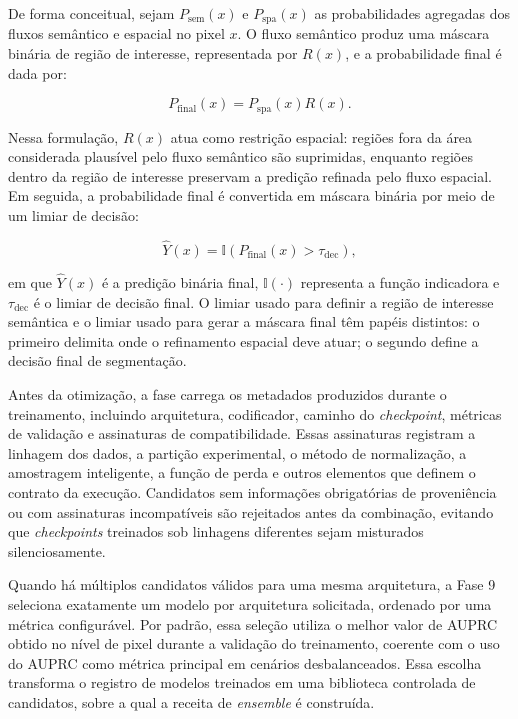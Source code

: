 De forma conceitual, sejam $P_{\mathrm{sem}}(x)$ e $P_{\mathrm{spa}}(x)$ as
probabilidades agregadas dos fluxos semântico e espacial no pixel $x$. O fluxo
semântico produz uma máscara binária de região de interesse, representada por
$R(x)$, e a probabilidade final é dada por:

\begin{equation}\label{eq:two-stream-gated-ensemble}
    P_{\mathrm{final}}(x)
    =
    P_{\mathrm{spa}}(x)R(x).
\end{equation}

Nessa formulação, $R(x)$ atua como restrição espacial: regiões fora da área
considerada plausível pelo fluxo semântico são suprimidas, enquanto regiões
dentro da região de interesse preservam a predição refinada pelo fluxo espacial.
Em seguida, a probabilidade final é convertida em máscara binária por meio de um
limiar de decisão:

\begin{equation}\label{eq:ensemble-decision-threshold}
    \hat{Y}(x)
    =
    \mathbb{I}\left(P_{\mathrm{final}}(x)>\tau_{\mathrm{dec}}\right),
\end{equation}

em que $\hat{Y}(x)$ é a predição binária final, $\mathbb{I}(\cdot)$ representa a
função indicadora e $\tau_{\mathrm{dec}}$ é o limiar de decisão final. O limiar
usado para definir a região de interesse semântica e o limiar usado para gerar a
máscara final têm papéis distintos: o primeiro delimita onde o refinamento
espacial deve atuar; o segundo define a decisão final de segmentação.

Antes da otimização, a fase carrega os metadados produzidos durante o
treinamento, incluindo arquitetura, codificador, caminho do \textit{checkpoint},
métricas de validação e assinaturas de compatibilidade. Essas assinaturas
registram a linhagem dos dados, a partição experimental, o método de
normalização, a amostragem inteligente, a função de perda e outros elementos que
definem o contrato da execução. Candidatos sem informações obrigatórias de
proveniência ou com assinaturas incompatíveis são rejeitados antes da combinação,
evitando que \textit{checkpoints} treinados sob linhagens diferentes sejam
misturados silenciosamente.

Quando há múltiplos candidatos válidos para uma mesma arquitetura, a Fase 9
seleciona exatamente um modelo por arquitetura solicitada, ordenado por uma
métrica configurável. Por padrão, essa seleção utiliza o melhor valor de AUPRC
obtido no nível de pixel durante a validação do treinamento, coerente com o uso
do AUPRC como métrica principal em cenários desbalanceados. Essa escolha
transforma o registro de modelos treinados em uma biblioteca controlada de
candidatos, sobre a qual a receita de \textit{ensemble} é construída.

